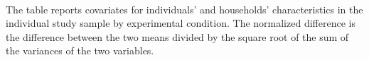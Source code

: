 \\
\begin{minipage}{1\linewidth}
  \vspace{0.05cm} \scriptsize The table reports  covariates for individuals' and households' characteristics in the individual study sample by experimental condition. The normalized difference is the difference between the two means divided by the square root of the sum of the variances of the two variables.\\
\end{minipage}

